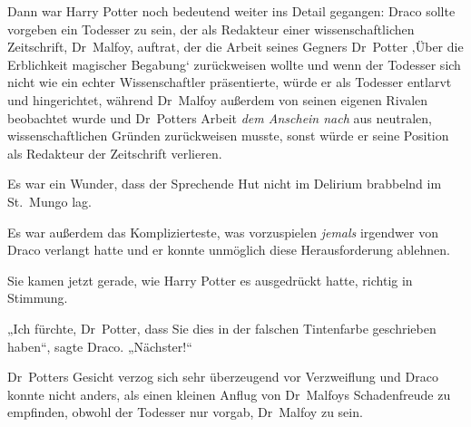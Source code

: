 Dann war Harry Potter noch bedeutend weiter ins Detail gegangen: Draco sollte vorgeben ein Todesser zu sein, der als Redakteur einer wissenschaftlichen Zeitschrift, Dr~Malfoy, auftrat, der die Arbeit seines Gegners Dr~Potter ‚Über die Erblichkeit magischer Begabung‘ zurückweisen wollte und wenn der Todesser sich nicht wie ein echter Wissenschaftler präsentierte, würde er als Todesser entlarvt und hingerichtet, während Dr~Malfoy außerdem von seinen eigenen Rivalen beobachtet wurde und Dr~Potters Arbeit \emph{dem Anschein nach} aus neutralen, wissenschaftlichen Gründen zurückweisen musste, sonst würde er seine Position als Redakteur der Zeitschrift verlieren.

Es war ein Wunder, dass der Sprechende Hut nicht im Delirium brabbelnd im St.~Mungo lag.

Es war außerdem das Komplizierteste, was vorzuspielen \emph{jemals} irgendwer von Draco verlangt hatte und er konnte unmöglich diese Herausforderung ablehnen.

Sie kamen jetzt gerade, wie Harry Potter es ausgedrückt hatte, richtig in Stimmung.

„Ich fürchte, Dr~Potter, dass Sie dies in der falschen Tintenfarbe geschrieben haben“, sagte Draco.
„Nächster!“

Dr~Potters Gesicht verzog sich sehr überzeugend vor Verzweiflung und Draco konnte nicht anders, als einen kleinen Anflug von Dr~Malfoys Schadenfreude zu empfinden, obwohl der Todesser nur vorgab, Dr~Malfoy zu sein.

